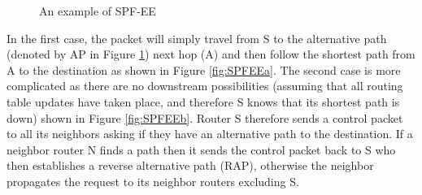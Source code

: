 \begin{figure}
  \centering
  \setcounter{subfigure}{1}
  \caption{An example of SPF-EE}
  \label{fig:SPFEE}
\end{figure}


In the first case, the packet will simply travel from S to the alternative path (denoted by AP in Figure \ref{fig:SPFEE}) next hop (A) and then follow the shortest path from A to the destination as shown in Figure \ref{fig:SPFEEa}. The second case is more complicated as there are no downstream possibilities (assuming that all routing table updates have taken place, and therefore S knows that its shortest path is down) shown in Figure \ref{fig:SPFEEb}. Router S therefore sends a control packet to all its neighbors asking if they have an alternative path to the destination. If a neighbor router N finds a path then it sends the control packet back to S who then establishes a reverse alternative path (RAP), otherwise the neighbor propagates the request to its neighbor routers excluding S. 

